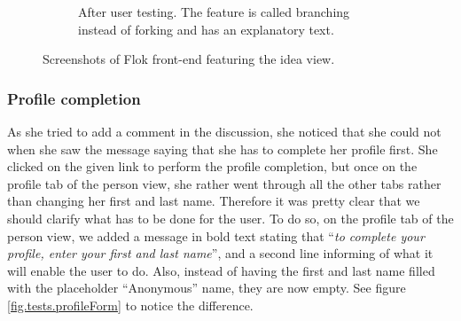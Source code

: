 \documentclass[a4paper,12pt, oneside]{article}
\begin{document}
\begin{figure}[!htb]
\begin{subfigure}[t]{.495\textwidth}
        \caption{After user testing. The feature is called branching instead of forking and has an explanatory text.}
        \label{fig.tests.forkBranchForm.after}
    \end{subfigure}
    \caption{Screenshots of Flok front-end featuring the idea view.}
    \label{fig.tests.forkBranchForm}
\end{figure}

\subsubsection*{Profile completion}
As she tried to add a comment in the discussion, she noticed that she could not when she saw the message saying that she has to complete her profile first.
She clicked on the given link to perform the profile completion, but once on the profile tab of the person view, she rather went through all the other tabs rather than changing her first and last name.
Therefore it was pretty clear that we should clarify what has to be done for the user.
To do so, on the profile tab of the person view, we added a message in bold text stating that “\emph{to complete your profile, enter your first and last name}”, and a second line informing of what it will enable the user to do.
Also, instead of having the first and last name filled with the placeholder “Anonymous” name, they are now empty.
See figure \ref{fig.tests.profileForm} to notice the difference.
\end{document}
